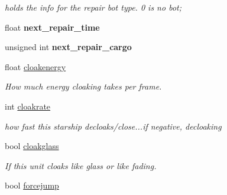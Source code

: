 \begin{DoxyCompactItemize}
\begin{DoxyCompactList}\small\item\em holds the info for the repair bot type. 0 is no bot; \end{DoxyCompactList}\item 
float {\bfseries next\+\_\+repair\+\_\+time}\hypertarget{structUnitImages_a6277268d05f3742adc2bc84c663932dc}{}\label{structUnitImages_a6277268d05f3742adc2bc84c663932dc}

\item 
unsigned int {\bfseries next\+\_\+repair\+\_\+cargo}\hypertarget{structUnitImages_a0d32176de31c6bf33f5971b93d502040}{}\label{structUnitImages_a0d32176de31c6bf33f5971b93d502040}

\item 
float \hyperlink{structUnitImages_aa17fe52802667e416403da40d5fc53d9}{cloakenergy}\hypertarget{structUnitImages_aa17fe52802667e416403da40d5fc53d9}{}\label{structUnitImages_aa17fe52802667e416403da40d5fc53d9}

\begin{DoxyCompactList}\small\item\em How much energy cloaking takes per frame. \end{DoxyCompactList}\item 
int \hyperlink{structUnitImages_aff13fbceb5151ea4894971d6d1f6ec68}{cloakrate}\hypertarget{structUnitImages_aff13fbceb5151ea4894971d6d1f6ec68}{}\label{structUnitImages_aff13fbceb5151ea4894971d6d1f6ec68}

\begin{DoxyCompactList}\small\item\em how fast this starship decloaks/close...if negative, decloaking \end{DoxyCompactList}\item 
bool \hyperlink{structUnitImages_a7aa6b875f018b00dbde4cf0665da9c91}{cloakglass}\hypertarget{structUnitImages_a7aa6b875f018b00dbde4cf0665da9c91}{}\label{structUnitImages_a7aa6b875f018b00dbde4cf0665da9c91}

\begin{DoxyCompactList}\small\item\em If this unit cloaks like glass or like fading. \end{DoxyCompactList}\item 
bool \hyperlink{structUnitImages_a1263fcc05e999ab997378547ff18519e}{forcejump}\hypertarget{structUnitImages_a1263fcc05e999ab997378547ff18519e}{}\label{structUnitImages_a1263fcc05e999ab997378547ff18519e}


\end{DoxyCompactItemize}
